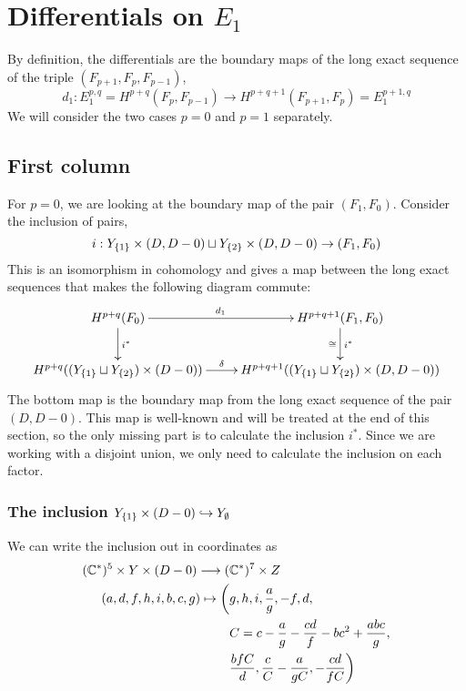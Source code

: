 \section{Differentials on $E_1$}
\label{sec:orientation}

By definition, the differentials are the boundary maps of the long
exact sequence of the triple $(F_{p+1},F_p,F_{p-1})$,
\[ d_1 : E_1^{p,q} = H^{p+q}(F_p,F_{p-1}) \to H^{p+q+1}(F_{p+1},F_p) =
E_1^{p+1,q} \]
We will consider the two cases $p=0$ and $p=1$ separately.

\subsection{First column}

For $p = 0$, we are looking at the boundary map of the pair
$(F_1,F_0)$. Consider the inclusion of pairs,
\[ i : Y_{\left\{ 1 \right\}}\times (D,D-0) \sqcup Y_{\left\{ 2 \right\}}\times (D,D-0) \to
(F_1,F_0) \]
This is an isomorphism in cohomology and gives a map between the long
exact sequences that makes the following diagram
commute:
\[ \xymatrix{
H^{p+q}(F_0) \ar[r]^>>>>>>>>>>>>>>>>>>>>{d_1} \ar[d]^{i^*} &
H^{p+q+1}(F_1,F_0) \ar[d]^{i^*}_{\cong} \\
H^{p+q}((Y_{\set{1}}\sqcup Y_{\set{2}})\times (D-0))
\ar[r]^>>>>>{\delta} & H^{p+q+1}((Y_{\set{1}}\sqcup Y_{\set{2}})\times
(D,D-0)) } \]
The bottom map is the boundary map from the long exact sequence of the
pair $(D,D-0)$. This map is well-known and will be treated at the end
of this section, so the only missing part is to calculate the
inclusion $i^*$. Since we are working with a disjoint union, we only
need to calculate the inclusion on each factor.

\subsubsection{The inclusion $Y_{\left\{ 1 \right\}}\times (D-0) 
  \hookrightarrow Y_\emptyset$}

We can write the inclusion out in coordinates as
\begin{align*}
  (\mathbb{C}^*)^5\times Y \times (D-0) \longrightarrow
  (&\mathbb{C}^*)^7\times Z \\
  (a,d,f,h,i,b,c,g) \mapsto \bigg(&g,h,i,\frac{a}{g},-f,d,\\
  & C =
  c-\frac{a}{g}-\frac{cd}{f}-bc^2+\frac{abc}{g}, \\
  & \frac{bfC}{d},\frac{c}{C}-\frac{a}{g C},-\frac{cd}{fC}\bigg) 
\end{align*}

